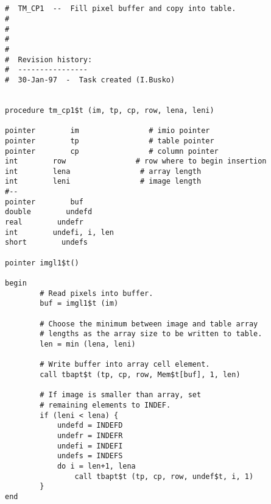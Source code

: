 \begin{verbatim}


#  TM_CP1  --  Fill pixel buffer and copy into table.
#
#
#
#
#  Revision history:
#  ----------------
#  30-Jan-97  -  Task created (I.Busko)


procedure tm_cp1$t (im, tp, cp, row, lena, leni)

pointer        im                # imio pointer
pointer        tp                # table pointer
pointer        cp                # column pointer
int        row                # row where to begin insertion
int        lena                # array length
int        leni                # image length
#--
pointer        buf
double        undefd
real        undefr
int        undefi, i, len
short        undefs

pointer imgl1$t()

begin
        # Read pixels into buffer.
        buf = imgl1$t (im)

        # Choose the minimum between image and table array 
        # lengths as the array size to be written to table.
        len = min (lena, leni)

        # Write buffer into array cell element.
        call tbapt$t (tp, cp, row, Mem$t[buf], 1, len)

        # If image is smaller than array, set
        # remaining elements to INDEF.
        if (leni < lena) {
            undefd = INDEFD
            undefr = INDEFR
            undefi = INDEFI
            undefs = INDEFS
            do i = len+1, lena
                call tbapt$t (tp, cp, row, undef$t, i, 1)
        }
end




\end{verbatim}
\newpage

